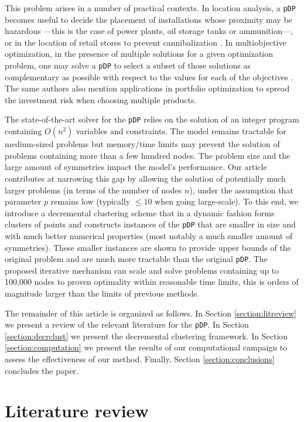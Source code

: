 \documentclass[a4paper,10pt]{article}
\newcommand{\pDP}{\texttt{pDP}}
\begin{document}
This problem arises in a number of practical contexts. In location analysis, a \pDP{} becomes useful to decide the placement of installations whose proximity may be hazardous ---this is the case of power plants, oil storage tanks or ammunition---, or in the location of retail stores to prevent cannibalization \citep{Kuby1987Programming}. In multiobjective optimization, in the presence of multiple solutions for a given optimization problem, one may solve a \pDP{} to select a subset of those solutions as complementary as possible with respect to the values for each of the objectives \citep{Saboonchi2014MaxMinMin}. The same authors also mention applications in portfolio optimization to spread the investment risk when choosing multiple products.

The state-of-the-art solver for the \pDP{} \citep{Sayah2017new} relies on the solution of an integer program containing $O(n^2)$ variables and constraints. The model remains tractable for medium-sized problems but memory/time limits may prevent the solution of problems containing more than a few hundred nodes. The problem size and the large amount of symmetries impact the model's performance. Our article contributes at narrowing this gap by allowing the solution of potentially much larger problems (in terms of the number of nodes $n$), under the assumption that parameter $p$ remains low (typically $\leq 10$ when going large-scale). To this end, we introduce a decremental clustering scheme that in a dynamic fashion forms clusters of points and constructs instances of the \pDP{} that are smaller in size and with much better numerical properties (most notably a much smaller amount of symmetries). These smaller instances are shown to provide upper bounds of the original problem and are much more tractable than the original \pDP{}. The proposed iterative mechanism can scale and solve problems containing up to 100,000 nodes to proven optimality within reasonable time limits, this is orders of magnitude larger than the limits of previous methods.

The remainder of this article is organized as follows. In Section \ref{section:litreview} we present a review of the relevant literature for the \pDP. In Section \ref{section:decrclust} we present the decremental clustering framework. In Section \ref{section:computation} we present the results of our computational campaign to assess the effectiveness of our method. Finally, Section \ref{section:conclusions} concludes the paper.

\section{Literature review\label{section:litreview}}
\end{document}
